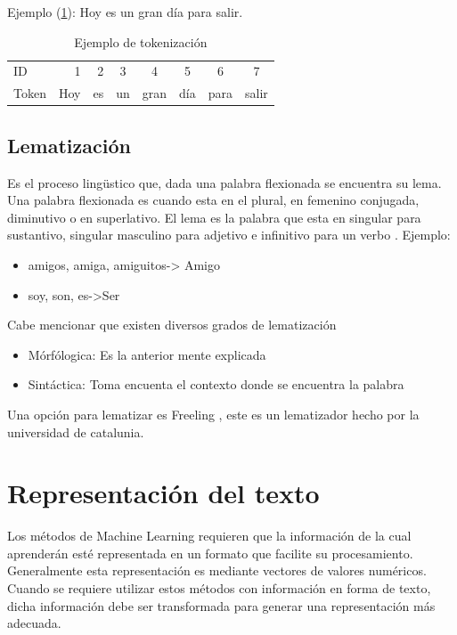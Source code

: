 Ejemplo  (\ref{tabla:sencilla}): Hoy es un gran día para salir.

\begin{table}[htbp]
	\begin{center}
	\begin{tabular}{|lrrccccc|}
		\hline
		ID & 1 & 2 & 3 & 4 & 5 & 6 & 7 \\ 
		Token & Hoy & es & un & gran & día & para & salir \\ \hline
		\hline
	\end{tabular}
	\caption{Ejemplo de tokenización}
	\label{tabla:sencilla}
	\end{center}
	
\end{table}


\subsection{Lematización}
Es el proceso lingüstico que, dada una palabra flexionada se encuentra su
lema. Una palabra flexionada es cuando esta en el plural, en femenino conjugada,
diminutivo o en superlativo. El lema es la palabra que esta en singular para
sustantivo, singular masculino para adjetivo e infinitivo para un verbo \citep{CT13}. Ejemplo:

	\begin{itemize}
		\item amigos, amiga, amiguitos-> Amigo
		\item soy, son, es->Ser
	\end{itemize}

Cabe mencionar que existen diversos grados de lematización

	\begin{itemize}
		\item Mórfólogica: Es la anterior mente explicada
		\item Sintáctica: Toma encuenta el contexto donde se encuentra la palabra

	\end{itemize}

Una opción para lematizar es Freeling \citep{CT18}, este es un lematizador hecho por la
universidad de catalunia.

\section[Representación del t.]{Representación del texto}
Los métodos de Machine Learning requieren que la información de la cual aprenderán esté representada en un
formato que facilite su procesamiento. Generalmente esta representación es mediante vectores de valores numéricos. 
Cuando se requiere utilizar estos métodos con información en forma de texto, dicha
información debe ser transformada para generar una representación más adecuada. 

